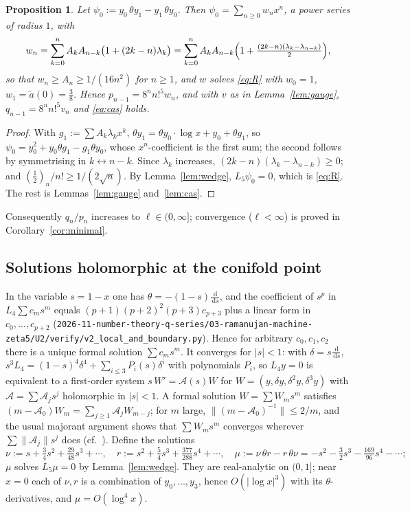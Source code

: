 \documentclass[11pt]{amsart}
\newtheorem{proposition}[theorem]{Proposition}
\theoremstyle{definition}
\theoremstyle{remark}
\numberwithin{equation}{section}
\newcommand{\dd}{\,\mathrm{d}}
\newcommand{\at}{\tilde a}
\newcommand{\file}[1]{\nolinkurl{2026-11-number-theory-q-series/03-ramanujan-machine-zeta5/#1}}
\begin{document}
\begin{proposition}\label{prop:U2seq}
Let $\psi_0:=y_0\,\theta y_1-y_1\,\theta y_0$. Then $\psi_0=\sum_{n\ge0}w_nx^n$, a power series of radius $1$, with
\[
w_n=\sum_{k=0}^nA_kA_{n-k}\bigl(1+(2k-n)\lambda_k\bigr)=\sum_{k=0}^nA_kA_{n-k}\Bigl(1+\tfrac{(2k-n)(\lambda_k-\lambda_{n-k})}2\Bigr),
\]
so that $w_n\ge A_n\ge1/(16n^2)$ for $n\ge1$,
and $w$ solves \eqref{eq:R} with $w_0=1$, $w_1=\at(0)=\frac38$. Hence $p_{n-1}=8^nn!^5w_n$, and with $v$ as in Lemma~\ref{lem:gauge}, $q_{n-1}=8^nn!^5v_n$ and \eqref{eq:cas} holds.
\end{proposition}
\begin{proof}
With $g_1:=\sum A_k\lambda_kx^k$, $\theta y_1=\theta y_0\cdot\log x+y_0+\theta g_1$, so $\psi_0=y_0^2+y_0\theta g_1-g_1\theta y_0$, whose $x^n$-coefficient is the first sum; the second follows by symmetrising in $k\leftrightarrow n-k$. Since $\lambda_k$ increases, $(2k-n)(\lambda_k-\lambda_{n-k})\ge0$; and $(\frac12)_n/n!\ge1/(2\sqrt n)$. By Lemma~\ref{lem:wedge}, $L_5\psi_0=0$, which is \eqref{eq:R}. The rest is Lemmas~\ref{lem:gauge} and~\ref{lem:cas}.
\end{proof}

Consequently $q_n/p_n$ increases to $\ell\in(0,\infty]$; convergence ($\ell<\infty$) is proved in Corollary~\ref{cor:minimal}.

\subsection{Solutions holomorphic at the conifold point}
In the variable $s=1-x$ one has $\theta=-(1-s)\frac{\dd}{\dd s}$, and the coefficient of $s^p$ in $L_4\sum c_ms^m$ equals $(p+1)(p+2)^2(p+3)c_{p+3}$ plus a linear form in $c_0,\dots,c_{p+2}$ (\file{U2/verify/v2_local_and_boundary.py}). Hence for arbitrary $c_0,c_1,c_2$ there is a unique formal solution $\sum c_ms^m$. It converges for $|s|<1$: with $\delta=s\frac{\dd}{\dd s}$, $s^3L_4=(1-s)^4\delta^4+\sum_{i\le3}P_i(s)\delta^i$ with polynomials $P_i$, so $L_4y=0$ is equivalent to a first-order system $s\,W'=\mathcal A(s)W$ for $W=(y,\delta y,\delta^2y,\delta^3y)$ with $\mathcal A=\sum\mathcal A_js^j$ holomorphic in $|s|<1$. A formal solution $W=\sum W_ms^m$ satisfies $(m-\mathcal A_0)W_m=\sum_{j\ge1}\mathcal A_jW_{m-j}$; for $m$ large, $\|(m-\mathcal A_0)^{-1}\|\le2/m$, and the usual majorant argument shows that $\sum W_ms^m$ converges wherever $\sum\|\mathcal A_j\|s^j$ does (cf.\ \cite[ch.~4]{CL}). Define the solutions
\[
\nu:=s+\tfrac34s^2+\tfrac{29}{48}s^3+\cdots,\quad r:=s^2+\tfrac54s^3+\tfrac{377}{288}s^4+\cdots,\quad \mu:=\nu\,\theta r-r\,\theta\nu=-s^2-\tfrac32s^3-\tfrac{169}{96}s^4-\cdots;
\]
$\mu$ solves $L_5\mu=0$ by Lemma~\ref{lem:wedge}. They are real-analytic on $(0,1]$; near $x=0$ each of $\nu,r$ is a combination of $y_0,\dots,y_3$, hence $O(|\log x|^3)$ with its $\theta$-derivatives, and $\mu=O(\log^4x)$.
\end{document}
